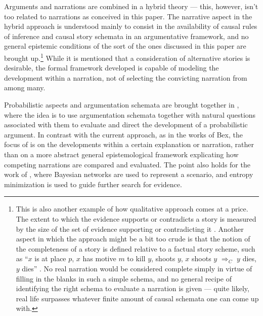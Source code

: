 \documentclass[10pt,leqno]{article}
\begin{document}







Arguments and narrations are combined in a hybrid theory \citep{bex2010hybrid,bex2013legal} --- this, however, isn't too related to narrations as conceived in this paper. The narrative aspect in the hybrid approach is understood mainly to consist in the availability of causal rules of inference and causal story schemata in an argumentative framework, and no general epistemic conditions of the sort of the ones discussed in this paper are brought up.\footnote{This is also another example of how qualitative approach comes at a price. The extent to which the evidence supports or contradicts a  story is measured by the size of the set of evidence supporting or contradicting it \citep[145]{bex2010hybrid}. Another aspect in which the approach might be a bit too crude is that the notion of the completeness of  a story is defined relative to  a  factual story scheme, such as  ``$x$ is at place $p$, $x$ has motive $m$ to kill $y$, shoots $y$, $x$ shoots $y$ $\Rightarrow_C$ $y$ dies, $y$ dies'' \citep[261]{bex2013legal}. No real narration would be considered complete simply in virtue of  filling in the blanks in such a simple schema, and no general recipe of identifying the right schema to evaluate a narration is given --- quite likely, real life surpasses whatever finite amount of causal schemata one can come up with.\label{fn:causal_schemata}} While it is mentioned that a consideration of alternative stories is desirable, the  formal framework developed is capable of  modeling the development within a narration, not of selecting the convicting narration from among many.

Probabilistic aspects and argumentation schemata are brought together in \citep{keppens2014modelling}, where the idea is to use argumentation schemata together with natural questions associated with them to evaluate and direct the development of a probabilistic argument. In contrast with the current approach, as in the works of Bex, the focus of \citep{keppens2014modelling} is on the developments within a certain explanation or narration, rather than on a more abstract general epistemological framework explicating how competing narrations are compared and evaluated.   The point also holds for the  work of \citep{shen2006scenario}, where Bayesian networks are used to represent a scenario, and entropy minimization is used to guide further search for evidence. 
\end{document}
